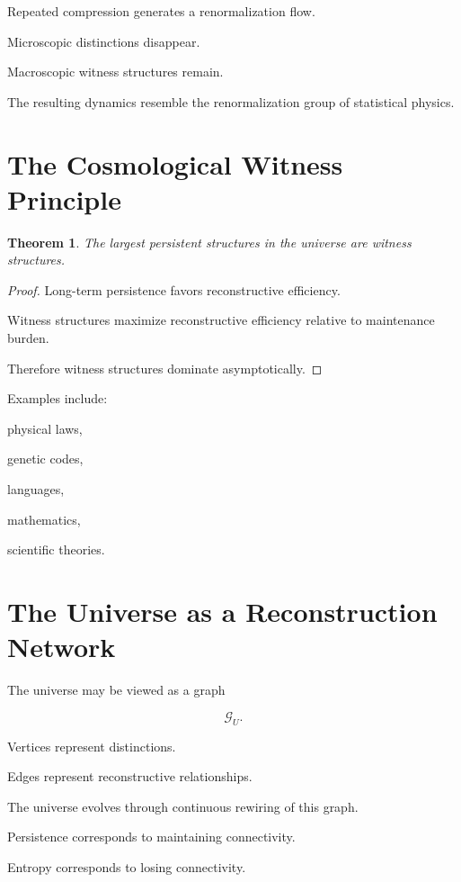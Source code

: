 \documentclass[12pt,oneside]{book}
\theoremstyle{plain} \newtheorem{theorem}{Theorem}[chapter] \newtheorem{lemma}[theorem]{Lemma} \newtheorem{proposition}[theorem]{Proposition} \newtheorem{corollary}[theorem]{Corollary}
\theoremstyle{definition} \newtheorem{definition}[theorem]{Definition} \newtheorem{axiom}[theorem]{Axiom} \newtheorem{construction}[theorem]{Construction}
\theoremstyle{remark} \newtheorem{remark}[theorem]{Remark} \newtheorem{example}[theorem]{Example}
\begin{document}
Repeated compression generates a renormalization flow.

Microscopic distinctions disappear.

Macroscopic witness structures remain.

The resulting dynamics resemble the renormalization group of statistical physics.

\section{The Cosmological Witness Principle}

\begin{theorem}

The largest persistent structures in the universe are witness structures.

\end{theorem}

\begin{proof}

Long-term persistence favors reconstructive efficiency.

Witness structures maximize reconstructive efficiency relative to maintenance burden.

Therefore witness structures dominate asymptotically.

\end{proof}

Examples include:

physical laws,

genetic codes,

languages,

mathematics,

scientific theories.

\section{The Universe as a Reconstruction Network}

The universe may be viewed as a graph

\[
\mathcal G_U.
\]

Vertices represent distinctions.

Edges represent reconstructive relationships.

The universe evolves through continuous rewiring of this graph.

Persistence corresponds to maintaining connectivity.

Entropy corresponds to losing connectivity.
\end{document}
